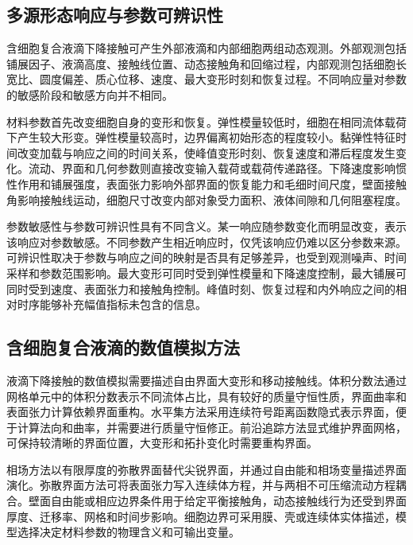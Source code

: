 \subsection{多源形态响应与参数可辨识性}

含细胞复合液滴下降接触可产生外部液滴和内部细胞两组动态观测。外部观测包括铺展因子、液滴高度、接触线位置、动态接触角和回缩过程，内部观测包括细胞长宽比、圆度偏差、质心位移、速度、最大变形时刻和恢复过程。不同响应量对参数的敏感阶段和敏感方向并不相同\cite{tasoglu2010compound,blanken2021compoundperspective,dudani2016viscoelastic}。

材料参数首先改变细胞自身的变形和恢复。弹性模量较低时，细胞在相同流体载荷下产生较大形变。弹性模量较高时，边界偏离初始形态的程度较小。黏弹性特征时间改变加载与响应之间的时间关系，使峰值变形时刻、恢复速度和滞后程度发生变化。流动、界面和几何参数则直接改变输入载荷或载荷传递路径。下降速度影响惯性作用和铺展强度，表面张力影响外部界面的恢复能力和毛细时间尺度，壁面接触角影响接触线运动，细胞尺寸改变内部对象受力面积、液体间隙和几何阻塞程度\cite{tasoglu2010compound,blanken2021compoundperspective,josserand2016drop}。

参数敏感性与参数可辨识性具有不同含义。某一响应随参数变化而明显改变，表示该响应对参数敏感。不同参数产生相近响应时，仅凭该响应仍难以区分参数来源。可辨识性取决于参数与响应之间的映射是否具有足够差异，也受到观测噪声、时间采样和参数范围影响\cite{raue2009identifiability}。最大变形可同时受到弹性模量和下降速度控制，最大铺展可同时受到速度、表面张力和接触角控制。峰值时刻、恢复过程和内外响应之间的相对时序能够补充幅值指标未包含的信息。

\subsection{含细胞复合液滴的数值模拟方法}

液滴下降接触的数值模拟需要描述自由界面大变形和移动接触线。体积分数法通过网格单元中的体积分数表示不同流体占比，具有较好的质量守恒性质，界面曲率和表面张力计算依赖界面重构\cite{hirt1981vof}。水平集方法采用连续符号距离函数隐式表示界面，便于计算法向和曲率，并需要进行质量守恒修正\cite{osher1988fronts,sussman1994levelset}。前沿追踪方法显式维护界面网格，可保持较清晰的界面位置，大变形和拓扑变化时需要重构界面\cite{unverdi1992fronttracking}。

相场方法以有限厚度的弥散界面替代尖锐界面，并通过自由能和相场变量描述界面演化。弥散界面方法可将表面张力写入连续体方程，并与两相不可压缩流动方程耦合\cite{anderson1998diffuseinterface,jacqmin1999phasefield,badalassi2003phasefield}。壁面自由能或相应边界条件用于给定平衡接触角，动态接触线行为还受到界面厚度、迁移率、网格和时间步影响。细胞边界可采用膜、壳或连续体实体描述，模型选择决定材料参数的物理含义和可输出变量\cite{freund2014bloodcells,barthesbiesel2016motion}。

